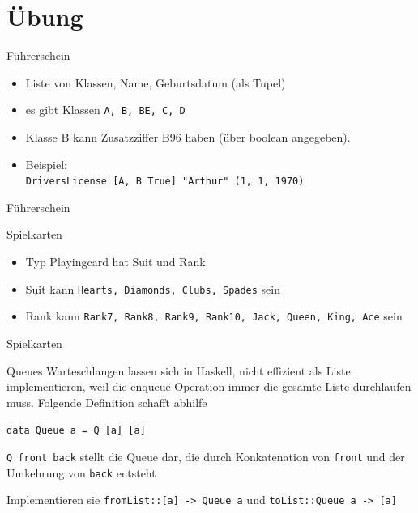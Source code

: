 \documentclass{beamer}
\begin{document}
\section{Übung}

\begin{frame}{Führerschein}
  \begin{itemize}
    \item Liste von Klassen, Name, Geburtsdatum (als Tupel)
    \item es gibt Klassen \texttt{A, B, BE, C, D}
    \item Klasse B kann Zusatzziffer B96 haben (über boolean angegeben).
    \item Beispiel:\\
          \texttt{DriversLicense [A, B True] "{}Arthur"{} (1, 1, 1970)}
  \end{itemize}
\end{frame}

\begin{frame}{Führerschein}
\end{frame}

\begin{frame}{Spielkarten}
    \begin{itemize}
        \item Typ Playingcard hat Suit und Rank
        \item Suit kann \texttt{Hearts, Diamonds, Clubs, Spades} sein
        \item Rank kann \texttt{Rank7, Rank8, Rank9, Rank10, Jack, Queen, King, Ace} sein
    \end{itemize}
\end{frame}

\begin{frame}{Spielkarten}
\end{frame}

\begin{frame}{Queues}
  Warteschlangen lassen sich in Haskell, nicht effizient als Liste implementieren, weil die enqueue Operation immer die gesamte Liste durchlaufen muss. Folgende Definition schafft abhilfe
  
  \texttt{data Queue a = Q [a] [a]}

  \texttt{Q front back} stellt die Queue dar, die durch Konkatenation von \texttt{front} und der Umkehrung von \texttt{back} entsteht

  Implementieren sie \texttt{fromList::[a] -> Queue a} und \texttt{toList::Queue a -> [a]}
\end{frame}
\end{document}
